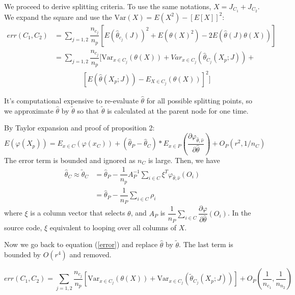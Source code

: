 \documentclass[12pt,letterpaper]{article}
\newcommand{\var}{\mathrm{Var }}
\begin{document}
We proceed to derive splitting criteria. To use the same notations, $ X = J_{C_1} + J_{C_2} $. We expand the square and use the $ \var(X) = E(X^2) - [E[X]]^2 $:
\begin{equation}
	\begin{aligned}\label{error} 
		err(C_1, C_2)  &  = \sum_{j=1,2} \dfrac{n_{c_j}}{n_p}[E(\hat{\theta}_{c_j}(J))^2 + E(\theta(X)^2) - 2E(\hat{\theta}(J)\theta(X)) ] \\
		 & = \sum_{j=1,2} \dfrac{n_{c_j}}{n_{p}} [\var_{x \in C_j} (\theta(X)) + Var_{x \in C_{j}}(\hat{\theta}_{C_j}(X_{p};J)) +  \\ 
		 & \qquad \qquad [ E(\hat{\theta}(X_{p};J)) - E_{X\in C_{j}}(\theta(X)) ]^2  ]
	\end{aligned} 
\end{equation}

 
It's computational expensive to re-evaluate $ \hat{\theta} $ for all possible splitting points, so we approximate $ \hat{\theta} $ by $ \tilde{\theta} $ so that  $ \tilde{\theta} $ is calculated at the parent node for one time. 

By Taylor expansion and proof of proposition 2:
\begin{equation}\label{key}
	E(\varphi(X_p)) = E_{x \in C}(\varphi(x_C)) + (\hat{\theta}_P - \hat{\theta}_C) *  E_{x\in P}(\dfrac{\partial \varphi_{\hat{\theta}, \hat \nu}}{\partial \hat{\theta}}) + O_P(r^2, 1/n_C)
\end{equation}
The error term is bounded and ignored as $ n_C $ is large. Then, we have 
\begin{equation}
	\begin{aligned}\label{approximation}
	\hat{\theta}_C \approx	\tilde{\theta}_C & = \hat{\theta}_{P} - \dfrac{1}{n_{p}} A_{P}^{-1} \sum\limits_{i \in C} \xi^T \varphi_{\hat{\theta}, \hat{\nu}}(O_{i}) \\
		& = \hat{\theta}_{P} - \dfrac{1}{n_P} \sum_{i\in C} \rho_{i}
	\end{aligned}
\end{equation}
where $ \xi $ is a column vector that selects $ \theta $, and  $ A_P $ is $ \dfrac{1}{n_P}   \sum\limits_{i \in C} \dfrac{\partial \varphi}{\partial  \hat{\theta}}(O_i) $. In the source code, $ \xi $  equivalent to looping over all columns of $ X $. 


Now we go back to equation (\ref{error}) and replace $ \hat{\theta} $ by $ \tilde{\theta} $. The  last term is bounded by $ O(r^4) $ and removed. 

\begin{equation}\label{key}
	err(C_1, C_2) = \sum_{j=1,2} \dfrac{n_{c_j}}{n_{p}} [\var_{x \in C_j} (\theta(X)) + \var_{x \in C_{j}}(\tilde{\theta}_{C_j}(X_{p};J))]  + O_P(\dfrac{1}{n_{c_1}}, \dfrac{1}{n_{n_2}})
\end{equation}
\end{document}
